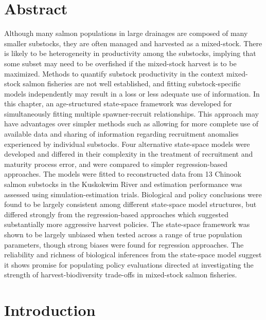 \documentclass[12pt,]{book}
\theoremstyle{definition}
\theoremstyle{definition}
\theoremstyle{definition}
\theoremstyle{remark}
\begin{document}
\section*{Abstract}\label{abstract-2}

\noindent
Although many salmon populations in large drainages are composed of many
smaller substocks, they are often managed and harvested as a
mixed-stock. There is likely to be heterogeneity in productivity among
the substocks, implying that some subset may need to be overfished if
the mixed-stock harvest is to be maximized. Methods to quantify substock
productivity in the context mixed-stock salmon fisheries are not well
established, and fitting substock-specific models independently may
result in a loss or less adequate use of information. In this chapter,
an age-structured state-space framework was developed for simultaneously
fitting multiple spawner-recruit relationships. This approach may have
advantages over simpler methods such as allowing for more complete use
of available data and sharing of information regarding recruitment
anomalies experienced by individual substocks. Four alternative
state-space models were developed and differed in their complexity in
the treatment of recruitment and maturity process error, and were
compared to simpler regression-based approaches. The models were fitted
to reconstructed data from 13 Chinook salmon substocks in the Kuskokwim
River and estimation performance was assessed using
simulation-estimation trials. Biological and policy conclusions were
found to be largely consistent among different state-space model
structures, but differed strongly from the regression-based approaches
which suggested substantially more aggressive harvest policies. The
state-space framework was shown to be largely unbiased when tested
across a range of true population parameters, though strong biases were
found for regression approaches. The reliability and richness of
biological inferences from the state-space model suggest it shows
promise for populating policy evaluations directed at investigating the
strength of harvest-biodiversity trade-offs in mixed-stock salmon
fisheries.

\section{Introduction}\label{introduction-2}
\end{document}
